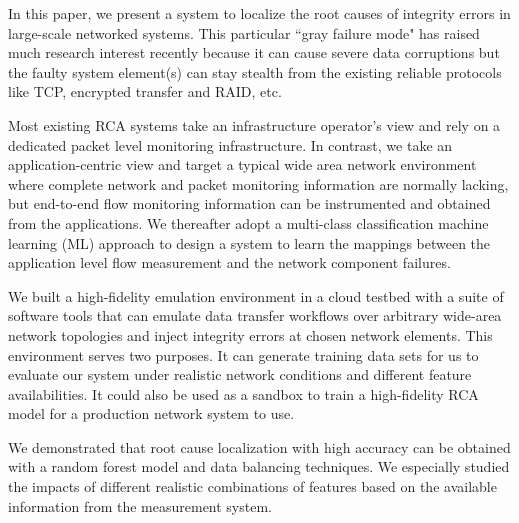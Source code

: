 In this paper, we present a system to localize the root causes of integrity errors in large-scale networked systems. 
This particular ``gray failure mode" has raised much research interest recently 
because it can cause severe data corruptions but the faulty system element(s) 
can stay stealth from the existing reliable protocols like TCP, encrypted transfer and RAID, etc.

Most existing RCA systems take an infrastructure operator's view and rely on a dedicated packet level monitoring infrastructure.
In contrast, we take an application-centric view and target a typical 
wide area network environment where complete network and packet monitoring information are normally lacking, but end-to-end flow monitoring information 
can be instrumented and obtained from the applications. We thereafter adopt a multi-class classification machine learning (ML) approach to design a system to learn the mappings 
between the application level flow measurement and the network component failures.

We built a high-fidelity emulation environment in a cloud testbed with a suite of software tools that can 
emulate data transfer workflows over arbitrary wide-area network topologies and inject integrity errors at chosen network elements.
This environment serves two purposes. It can generate training data sets for us to evaluate our system under 
realistic network conditions and different feature availabilities. It could also be used as a sandbox to train a high-fidelity 
RCA model for a production network system to use.
   
We demonstrated that root cause localization with high accuracy can be obtained with a random forest model and data balancing techniques. 
We especially studied the impacts of different realistic combinations of features based on the available information from the measurement system.   
